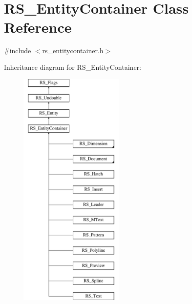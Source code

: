 \hypertarget{classRS__EntityContainer}{\section{R\-S\-\_\-\-Entity\-Container Class Reference}
\label{classRS__EntityContainer}
}


{\ttfamily \#include $<$rs\-\_\-entitycontainer.\-h$>$}

Inheritance diagram for R\-S\-\_\-\-Entity\-Container\-:\begin{figure}[H]
\begin{center}
\leavevmode
\includegraphics[height=12.000000cm]{classRS__EntityContainer}
\end{center}
\end{figure}
